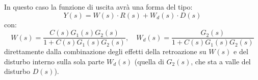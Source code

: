 \documentclass[a4paper,11pt]{article}
\begin{document}
\begin{itemize}
\begin{center}
		\end{center}

		In questo caso la funzione di uscita avrà una forma del tipo:
		$$
		Y(s) = W(s) \cdot R(s) + W_d(s) \cdot D(s)
		$$
		con:
		$$
		W(s) = \frac{C(s) G_1(s) G_2(s)}{1 + C(s) G_1(s) G_2(s)}, \quad W_d(s) = \frac{G_2(s)}{1 + C(s) G_1(s) G_2(s)}
		$$
		direttamente dalla combinazione degli effetti della retroazione su $W(s)$ e del disturbo interno sulla sola parte $W_d(s)$ (quella di $G_2(s)$, che sta a valle del disturbo $D(s)$).

\end{itemize}
\end{document}
